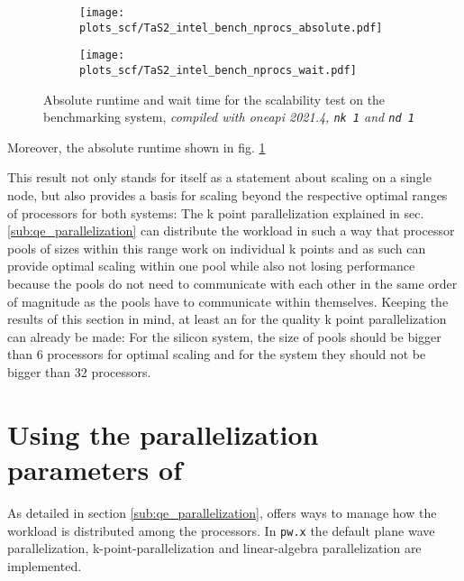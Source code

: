 \documentclass[main.tex]{subfiles}
\begin{document}
\begin{figure}[ht!]
    \begin{subfigure}[b]{0.49\textwidth}
        \centering
        \texttt{[image: plots\_scf/TaS2\_intel\_bench\_nprocs\_absolute.pdf]}
    \end{subfigure}
    \begin{subfigure}[b]{0.49\textwidth}
        \centering
        \texttt{[image: plots\_scf/TaS2\_intel\_bench\_nprocs\_wait.pdf]}
    \end{subfigure}
    \caption{Absolute runtime and wait time for the scalability test on the \TaS benchmarking system, \emph{\QE compiled with \gls{oneapi} 2021.4, \texttt{nk 1} and \texttt{nd 1}}}
    \label{fig:scaling_scf_intel_nprocs_tas2_absolute_wait}
\end{figure}
Moreover, the absolute runtime shown in fig. \ref{fig:scaling_scf_intel_nprocs_tas2_absolute_wait} 


This result not only stands for itself as a statement about scaling on a single node, but also provides a basis for scaling beyond the respective optimal ranges of processors for both systems:
The k point parallelization explained in sec. \ref{sub:qe_parallelization} can distribute the workload in such a way that processor pools of sizes within this range work on individual k points and as such can provide optimal scaling within one pool while also not losing performance because the pools do not need to communicate with each other in the same order of magnitude as the pools have to communicate within themselves.
Keeping the results of this section in mind, at least an for the quality k point parallelization can already be made:
For the silicon system, the size of pools should be bigger than 6 processors for optimal scaling and for the \TaS system they should not be bigger than 32 processors.

\section{Using the parallelization parameters of \QE}

As detailed in section \ref{sub:qe_parallelization}, \QE offers ways to manage how the workload is distributed among the processors.
In \texttt{pw.x} the default plane wave parallelization, k-point-parallelization and linear-algebra parallelization are implemented.
\end{document}
